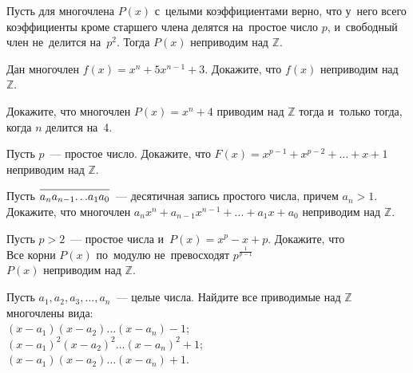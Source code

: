 


Пусть для многочлена $P(x)$ с~целыми коэффициентами верно, что у~него всего
коэффициенты кроме старшего члена делятся на~простое число $p$, и~свободный
член не~делится на~$p^2$.
Тогда $P(x)$ неприводим над $\mathbb{Z}$.

\begin{problems}

\item
Дан многочлен $f(x) = x^{n} + 5 x^{n-1} + 3$.
Докажите, что $f(x)$ неприводим над $\mathbb{Z}$.

\item
Докажите, что многочлен $P(x) = x^{n} + 4$ приводим над $\mathbb{Z}$ тогда и~только тогда, когда $n$ делится на~4.

\item
Пусть $p$~--- простое число.
Докажите, что $F(x) = x^{p-1} + x^{p-2} + \ldots + x + 1$ неприводим над $\mathbb{Z}$.

    \def\digits#1{\overline{\mathstrut#1}}
\item
Пусть $\digits{a_{n} a_{n-1} {\ldots} a_1 a_0}$~--- десятичная запись
простого числа, причем $a_{n} > 1$.
Докажите, что многочлен
$a_{n} x^{n} + a_{n-1} x^{n-1} + \ldots + a_{1} x + a_{0}$ неприводим
над $\mathbb{Z}$.

\item
Пусть $p > 2$~--- простое числа и~$P(x) = x^{p} - x + p$.
Докажите, что 
\\
\subproblem
Все корни $P(x)$ по~модулю не~превосходят $p^{\frac{1}{p-1}}$
\\
\subproblem
$P(x)$ неприводим над $\mathbb{Z}$.

\item
Пусть $a_{1}, a_{2}, a_{3}, \ldots, a_{n}$~--- целые числа.
Найдите все приводимые над $\mathbb{Z}$ многочлены вида:
\\
\subproblem $(x - a_{1}) (x - a_{2}) \ldots (x - a_{n}) - 1$;
\\
\subproblem $(x - a_{1})^2 (x - a_{2})^2 \ldots (x - a_{n})^2 + 1$;
\\
\subproblem $(x - a_{1}) (x - a_{2}) \ldots (x - a_{n}) + 1$.

\end{problems}

